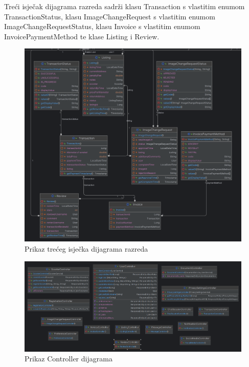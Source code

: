 Treći isječak dijagrama razreda sadrži klasu Transaction s vlastitim enumom TransactionStatus, klasu ImageChangeRequest s vlastitim enumom ImageChangeRequestStatus, klasu Invoice s vlastitim enumom InvoicePaymentMethod te klase Listing i Review.
\begin{figure} [H]

	\includegraphics[width=1\linewidth]{slike/ClassDiagram3.png}
	\centering
	\caption{Prikaz trećeg isječka dijagrama razreda}
	\label{fig:Prikaz trećeg isječka dijagrama razreda}
\end{figure}

\begin{figure} [H]

	\includegraphics[width=1\linewidth]{slike/ControllerDiagram.png}
	\centering
	\caption{Prikaz Controller dijagrama}
	\label{fig:Prikaz Controller dijagrama}
\end{figure}

